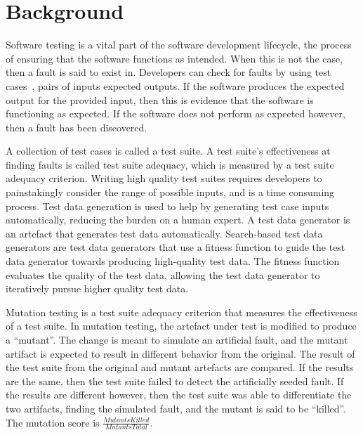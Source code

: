 \section{Background}\label{sec:background}
Software testing is a vital part of the software development lifecycle, the
process of ensuring that the software functions as intended.  When this is not the case, then a fault
is said to exist in. Developers can check for faults by using test cases~\cite{ammann2008}, pairs of inputs 
expected outputs. If the software produces the expected output for the provided input, then this is evidence
that the software is functioning as expected.  If the software does not perform as expected however, then a
fault has been discovered.

A collection of test cases is called a test suite. A test suite's effectiveness at finding faults is
called test suite adequacy, which is measured by a test suite adequacy criterion.
Writing high quality test suites requires developers to painstakingly consider the
range of possible inputs, and is a time consuming process. Test data generation is used to
help by generating test case inputs automatically, reducing the burden on a human expert. A test data
generator is an artefact that generates test data automatically.
Search-based test data generators are test data generators that use a fitness function to guide the
test data generator towards producing high-quality test data. The fitness function evaluates the
quality of the test data, allowing the test data generator to iteratively pursue higher quality test 
data.

Mutation testing is a test suite adequacy criterion that measures the effectiveness of a test suite. In
mutation testing, the artefact under test is modified to produce a ``mutant''. The
change is meant to simulate an artificial fault, and the mutant artifact is expected to result in
different behavior from the original. The result of the test suite from the original and mutant
artefacts are compared. If the results are the same, then the test suite failed to detect the
artificially seeded fault. If the results are different however, then the test suite was able to
differentiate the two artifacts, finding the simulated fault, and the mutant is said to be ``killed''.
The mutation score is $\frac{\mathit{MutantsKilled}}{\mathit{MutantsTotal}}$.



